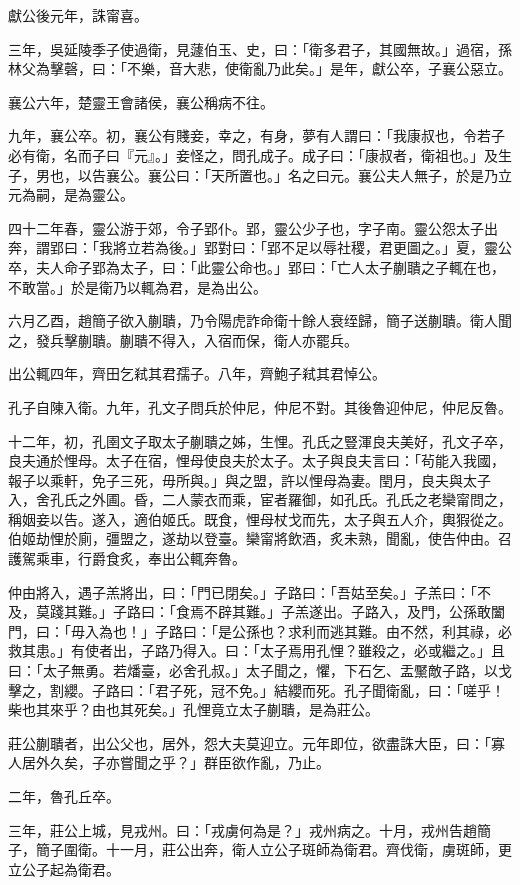 \begin{pinyinscope}
獻公後元年，誅甯喜。

三年，吳延陵季子使過衛，見蘧伯玉、史，曰：「衛多君子，其國無故。」過宿，孫林父為擊磬，曰：「不樂，音大悲，使衛亂乃此矣。」是年，獻公卒，子襄公惡立。

襄公六年，楚靈王會諸侯，襄公稱病不往。

九年，襄公卒。初，襄公有賤妾，幸之，有身，夢有人謂曰：「我康叔也，令若子必有衛，名而子曰『元』。」妾怪之，問孔成子。成子曰：「康叔者，衛祖也。」及生子，男也，以告襄公。襄公曰：「天所置也。」名之曰元。襄公夫人無子，於是乃立元為嗣，是為靈公。

四十二年春，靈公游于郊，令子郢仆。郢，靈公少子也，字子南。靈公怨太子出奔，謂郢曰：「我將立若為後。」郢對曰：「郢不足以辱社稷，君更圖之。」夏，靈公卒，夫人命子郢為太子，曰：「此靈公命也。」郢曰：「亡人太子蒯聵之子輒在也，不敢當。」於是衛乃以輒為君，是為出公。

六月乙酉，趙簡子欲入蒯聵，乃令陽虎詐命衛十餘人衰绖歸，簡子送蒯聵。衛人聞之，發兵擊蒯聵。蒯聵不得入，入宿而保，衛人亦罷兵。

出公輒四年，齊田乞弒其君孺子。八年，齊鮑子弒其君悼公。

孔子自陳入衛。九年，孔文子問兵於仲尼，仲尼不對。其後魯迎仲尼，仲尼反魯。

十二年，初，孔圉文子取太子蒯聵之姊，生悝。孔氏之豎渾良夫美好，孔文子卒，良夫通於悝母。太子在宿，悝母使良夫於太子。太子與良夫言曰：「茍能入我國，報子以乘軒，免子三死，毋所與。」與之盟，許以悝母為妻。閏月，良夫與太子入，舍孔氏之外圃。昏，二人蒙衣而乘，宦者羅御，如孔氏。孔氏之老欒甯問之，稱姻妾以告。遂入，適伯姬氏。既食，悝母杖戈而先，太子與五人介，輿猳從之。伯姬劫悝於廁，彊盟之，遂劫以登臺。欒甯將飲酒，炙未熟，聞亂，使告仲由。召護駕乘車，行爵食炙，奉出公輒奔魯。

仲由將入，遇子羔將出，曰：「門已閉矣。」子路曰：「吾姑至矣。」子羔曰：「不及，莫踐其難。」子路曰：「食焉不辟其難。」子羔遂出。子路入，及門，公孫敢闔門，曰：「毋入為也！」子路曰：「是公孫也？求利而逃其難。由不然，利其祿，必救其患。」有使者出，子路乃得入。曰：「太子焉用孔悝？雖殺之，必或繼之。」且曰：「太子無勇。若燔臺，必舍孔叔。」太子聞之，懼，下石乞、盂黶敵子路，以戈擊之，割纓。子路曰：「君子死，冠不免。」結纓而死。孔子聞衛亂，曰：「嗟乎！柴也其來乎？由也其死矣。」孔悝竟立太子蒯聵，是為莊公。

莊公蒯聵者，出公父也，居外，怨大夫莫迎立。元年即位，欲盡誅大臣，曰：「寡人居外久矣，子亦嘗聞之乎？」群臣欲作亂，乃止。

二年，魯孔丘卒。

三年，莊公上城，見戎州。曰：「戎虜何為是？」戎州病之。十月，戎州告趙簡子，簡子圍衛。十一月，莊公出奔，衛人立公子斑師為衛君。齊伐衛，虜斑師，更立公子起為衛君。


\end{pinyinscope}
